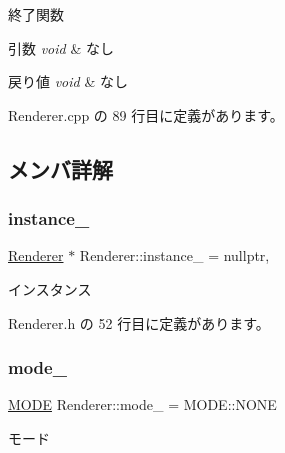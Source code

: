 終了関数 


\begin{DoxyParams}{引数}
{\em void} & なし \\
\hline
\end{DoxyParams}

\begin{DoxyRetVals}{戻り値}
{\em void} & なし \\
\hline
\end{DoxyRetVals}


 Renderer.\+cpp の 89 行目に定義があります。



\subsection{メンバ詳解}
\mbox{\label{class_renderer_aa0ca48ac8408e8726d5dd135432ae4fa}} 
\subsubsection{\texorpdfstring{instance\+\_\+}{instance\_}}
{\footnotesize\ttfamily \mbox{\hyperlink{class_renderer}{Renderer}} $\ast$ Renderer\+::instance\+\_\+ = nullptr\hspace{0.3cm}{\ttfamily [static]}, {\ttfamily [private]}}



インスタンス 



 Renderer.\+h の 52 行目に定義があります。

\mbox{\label{class_renderer_adaed44b3c6c8b0879b8cd52f677941cf}} 
\subsubsection{\texorpdfstring{mode\+\_\+}{mode\_}}
{\footnotesize\ttfamily \mbox{\hyperlink{class_renderer_ab5a9379ccadcf2b3394c61cf8c835fec}{M\+O\+DE}} Renderer\+::mode\+\_\+ = M\+O\+D\+E\+::\+N\+O\+NE\hspace{0.3cm}{\ttfamily [private]}}



モード 



